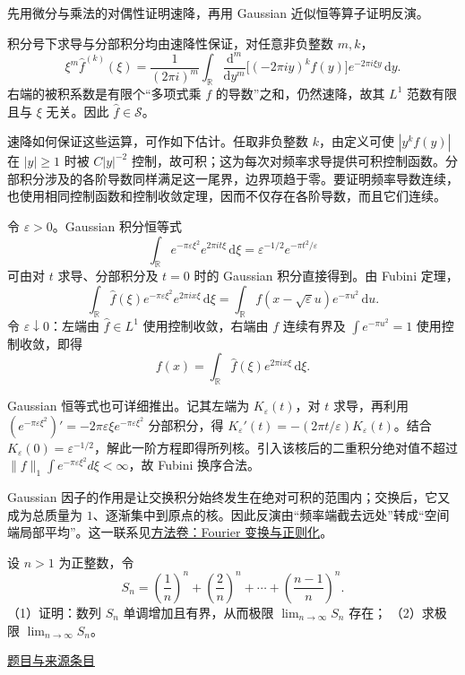 \documentclass[12pt,fontset=fandol]{ctexart}
\begin{document}
\begin{solve}\label{ans:fin08-hi:7}

先用微分与乘法的对偶性证明速降，再用 Gaussian 近似恒等算子证明反演。

积分号下求导与分部积分均由速降性保证，对任意非负整数 $m,k$，
\[
\xi^m\widehat f^{(k)}(\xi)=\frac1{(2\pi i)^m}\int_{\mathbb R}
\frac{\mathrm d^m}{\mathrm dy^m}\bigl[(-2\pi iy)^kf(y)\bigr]e^{-2\pi i\xi y}\,\mathrm dy.
\]
右端的被积系数是有限个“多项式乘 $f$ 的导数”之和，仍然速降，故其 $L^1$ 范数有限且与 $\xi$ 无关。因此 $\widehat f\in\mathcal S$。

速降如何保证这些运算，可作如下估计。任取非负整数 $k$，由定义可使 $|y^kf(y)|$ 在 $|y|\ge1$ 时被 $C|y|^{-2}$ 控制，故可积；这为每次对频率求导提供可积控制函数。分部积分涉及的各阶导数同样满足这一尾界，边界项趋于零。要证明频率导数连续，也使用相同控制函数和控制收敛定理，因而不仅存在各阶导数，而且它们连续。

令 $\varepsilon>0$。Gaussian 积分恒等式
\[
\int_{\mathbb R}e^{-\pi\varepsilon\xi^2}e^{2\pi it\xi}\,\mathrm d\xi
=\varepsilon^{-1/2}e^{-\pi t^2/\varepsilon}
\]
可由对 $t$ 求导、分部积分及 $t=0$ 时的 Gaussian 积分直接得到。由 Fubini 定理，
\[
\int_{\mathbb R}\widehat f(\xi)e^{-\pi\varepsilon\xi^2}e^{2\pi ix\xi}\,\mathrm d\xi
=\int_{\mathbb R}f(x-\sqrt\varepsilon u)e^{-\pi u^2}\,\mathrm du.
\]
令 $\varepsilon\downarrow0$：左端由 $\widehat f\in L^1$ 使用控制收敛，右端由 $f$ 连续有界及 $\int e^{-\pi u^2}=1$ 使用控制收敛，即得
\[
f(x)=\int_{\mathbb R}\widehat f(\xi)e^{2\pi ix\xi}\,\mathrm d\xi.
\]

Gaussian 恒等式也可详细推出。记其左端为 $K_\varepsilon(t)$，对 $t$ 求导，再利用 $(e^{-\pi\varepsilon\xi^2})'=-2\pi\varepsilon\xi e^{-\pi\varepsilon\xi^2}$ 分部积分，得 $K_\varepsilon'(t)=-(2\pi t/\varepsilon)K_\varepsilon(t)$。结合 $K_\varepsilon(0)=\varepsilon^{-1/2}$，解此一阶方程即得所列核。引入该核后的二重积分绝对值不超过 $\|f\|_1\int e^{-\pi\varepsilon\xi^2}d\xi<\infty$，故 Fubini 换序合法。

\end{solve}

\begin{remark}[方法与条件]Gaussian 因子的作用是让交换积分始终发生在绝对可积的范围内；交换后，它又成为总质量为 $1$、逐渐集中到原点的核。因此反演由“频率端截去远处”转成“空间端局部平均”。这一联系见\hyperref[app:integration-fourier]{方法卷：Fourier 变换与正则化}。\end{remark}

\begin{example}\label{ex:fin08-lo:8}\label{pr:fin08-lo:8}

设 $n>1$ 为正整数，令
\[
S_{n}=\left(\frac{1}{n}\right)^{n}+\left(\frac{2}{n}\right)^{n}+\cdots+\left(\frac{n-1}{n}\right)^{n}.
\]
（1）证明：数列 $S_{n}$ 单调增加且有界，从而极限 $\lim_{n\to\infty}S_{n}$ 存在；
（2）求极限 $\lim_{n\to\infty}S_{n}$。

\par\href{https://github.com/lzxcr/cmc-mathematics/blob/64916fa1fdbc3e444a652eca204d5669058ee321/src/problems/finals/08/08.md}{题目与来源条目}

\end{example}
\end{document}
